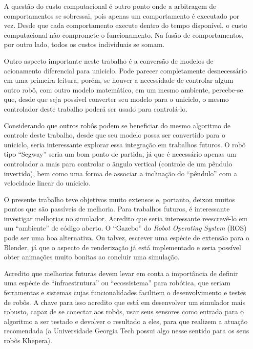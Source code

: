 A questão do custo computacional é outro ponto onde a arbitragem de comportamentos se sobressai,
pois apenas um comportamento é executado por vez. Desde que cada comportamento execute dentro
do tempo disponível, o custo computacional não compromete o funcionamento. Na fusão de 
comportamentos, por outro lado, todos os custos individuais se somam. 

Outro aspecto importante neste trabalho é a conversão de modelos de acionamento diferencial para uniciclo. Pode 
parecer completamente desnecessário em uma primeira leitura, porém, se houver a necessidade de controlar algum outro 
robô, com outro modelo matemático, em um mesmo ambiente, percebe-se que, desde que seja possível converter seu modelo 
para o uniciclo, o mesmo controlador deste trabalho poderá ser usado para controlá-lo.  
 
Considerando que outros robôs podem se beneficiar do mesmo algoritmo de controle deste trabalho, desde que 
seu modelo possa ser convertido para o uniciclo, seria interessante explorar essa integração em trabalhos futuros.
O robô tipo ``Segway'' seria um bom ponto de partida, já que é necessário apenas um controlador a mais para controlar
o ângulo vertical (controle de um pêndulo invertido), bem como uma forma de associar a inclinação do ``pêndulo'' com 
a velocidade linear do uniciclo.

O presente trabalho teve objetivos muito extensos e, portanto, deixou muitos pontos que são passíveis de melhoria.
Para trabalhos futuros, é interessante investigar melhorias no simulador. Acredito que seria interessante reescrevê-lo
em um ``ambiente'' de código aberto. O ``Gazebo'' do \textit{Robot Operating System} (ROS) pode ser uma boa 
alternativa. Ou talvez, escrever uma espécie de extensão para o Blender, já que o aspecto de renderização já está
implementado e seria possível obter animações muito bonitas ao concluir uma simulação.  

Acredito que melhorias futuras devem levar em conta a importância de definir uma espécie de 
``infraestrutura'' ou ``ecossistema'' para robótica, que seriam ferramentas e sistemas cujas
funcionalidades facilitem o desenvolvimento e testes de robôs. A chave para isso acredito que 
está em desenvolver um simulador mais robusto, capaz de se conectar aos robôs, usar seus
sensores como entrada para o algoritmo a ser testado e devolver o resultado a eles, para que
realizem a atuação recomendada (a Universidade Georgia Tech possui algo nesse sentido para 
os seus robôs Khepera). 


